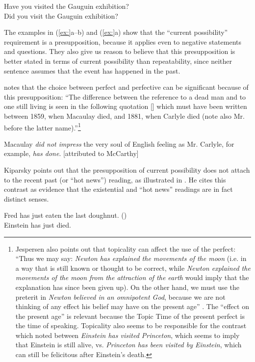 \ea
\ea Have you visited the Gauguin exhibition?\\
\ex Did you visit the Gauguin exhibition?
                       \z
\z


The examples in (\ref{ex:}a--b) and (\ref{ex:}a) show that the “current possibility” requirement is a presupposition, because it applies even to negative statements and questions. They also give us reason to believe that this presupposition is better stated in terms of current possibility than repeatability, since neither sentence assumes that the event has happened in the past.



\citet[66--67]{Jespersen1931} notes that the choice between perfect and perfective can be significant because of this presupposition: “The difference between the reference to a dead man and to one still living is seen in the following quotation [] which must have been written between 1859, when Macaulay died, and 1881, when Carlyle died (note also Mr. before the latter name).”\footnote{Jespersen also points out that topicality can affect the use of the perfect: “Thus we may say: \textit{Newton has explained the movements of the moon} (i.e. in a way that is still known or thought to be correct, while \textit{Newton explained the movements of the moon from the attraction of the earth} would imply that the explanation has since been given up). On the other hand, we must use the preterit in \textit{Newton believed in an omnipotent God}, because we are not thinking of any effect his belief may have on the present age” \citep[66]{Jespersen1931}. The “effect on the present age” is relevant because the Topic Time of the present perfect is the time of speaking. Topicality also seems to be responsible for the contrast which \citet{Chomsky1970} noted between \textit{Einstein has visited Princeton}, which seems to imply that Einstein is still alive, vs. \textit{Princeton has been visited by Einstein}, which can still be felicitous after Einstein’s death.}


\ea
Macaulay \textit{did not impress} the very soul of English feeling as Mr. Carlyle, for example, \textit{has done}. [attributed to McCarthy]
\z


Kiparsky points out that the presupposition of current possibility does not attach to the recent past (or “hot news”) reading, as illustrated in . He cites this contrast as evidence that the existential and “hot news” readings are in fact distinct senses.


\ea
\ea Fred has just eaten the last doughnut.  (\citealt{Kiparsky2002})\\
\ex Einstein has just died.
                       \z
\z


